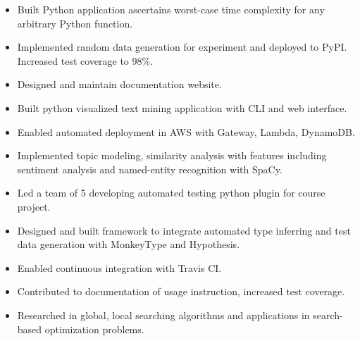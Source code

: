 







\begin{itemize}
\item Built Python application ascertains worst-case time complexity for any arbitrary Python function.
\item Implemented random data generation for experiment and deployed to PyPI. Increased test coverage to 98\%.
\item Designed and maintain documentation website.
\end{itemize}
\smallskip
{}
\begin{itemize}
\item Built python visualized text mining application with CLI and web interface.
\item Enabled automated deployment in AWS with Gateway, Lambda, DynamoDB.
\item Implemented topic modeling, similarity analysis with features including sentiment analysis and named-entity recognition with SpaCy.
\end{itemize}
\smallskip
{}
\begin{itemize}
\item Led a team of 5 developing automated testing python plugin for course project.
\item Designed and built framework to integrate automated type inferring and test data generation with MonkeyType and Hypothesis.
\end{itemize}
\smallskip
{}
\begin{itemize}
\item Enabled continuous integration with Travis CI.
\item Contributed to documentation of usage instruction, increased test coverage.
\item Researched in global, local searching algorithms and applications in search-based optimization problems.
\end{itemize}

